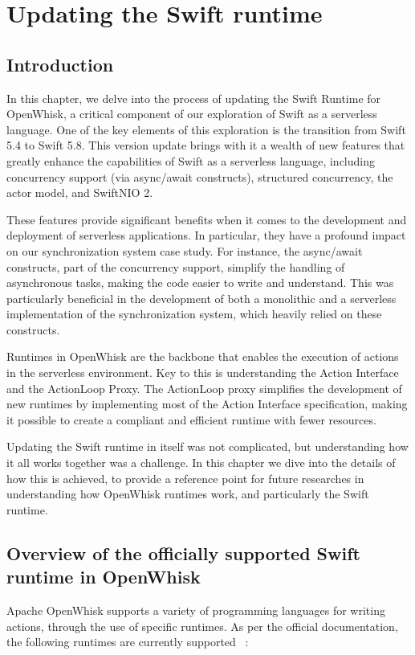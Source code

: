 \chapter{Updating the Swift runtime}
\label{ch:UpdatingRuntime}

\section{Introduction}
\label{sec:Introduction}

In this chapter, we delve into the process of updating the Swift Runtime for OpenWhisk, a critical component of our exploration of Swift as a serverless language. One of the key elements of this exploration is the transition from Swift 5.4 to Swift 5.8. This version update brings with it a wealth of new features that greatly enhance the capabilities of Swift as a serverless language, including concurrency support (via async/await constructs), structured concurrency, the actor model, and SwiftNIO 2.

These features provide significant benefits when it comes to the development and deployment of serverless applications. In particular, they have a profound impact on our synchronization system case study. For instance, the async/await constructs, part of the concurrency support, simplify the handling of asynchronous tasks, making the code easier to write and understand. This was particularly beneficial in the development of both a monolithic and a serverless implementation of the synchronization system, which heavily relied on these constructs.

Runtimes in OpenWhisk are the backbone that enables the execution of actions in the serverless environment. Key to this is understanding the Action Interface and the ActionLoop Proxy. The ActionLoop proxy simplifies the development of new runtimes by implementing most of the Action Interface specification, making it possible to create a compliant and efficient runtime with fewer resources.

Updating the Swift runtime in itself was not complicated, but understanding how it all works together was a challenge. In this chapter we dive into the details of how this is achieved, to provide a reference point for future researches in understanding how OpenWhisk runtimes work, and particularly the Swift runtime.
\section{Overview of the officially supported Swift runtime in OpenWhisk}
Apache OpenWhisk supports a variety of programming languages for writing actions, through the use of specific runtimes. As per the official documentation, the following runtimes are currently supported 
~\cite{openwhisk2023}:

